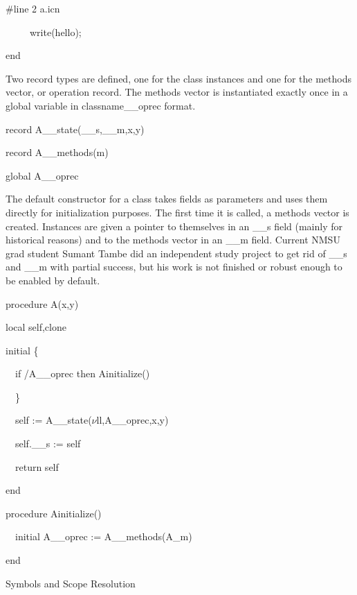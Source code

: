 \bigskip

{\ttfamily\mdseries
\#line 2 {\textquotedbl}a.icn{\textquotedbl}}

{\ttfamily\mdseries
\ \ \ \ \ write({\textquotedbl}hello{\textquotedbl});}

{\ttfamily\mdseries
end}


Two record types are defined, one for the class instances and one for
the {\textquotedbl}methods vector{\textquotedbl}, or
{\textquotedbl}operation record{\textquotedbl}. The methods vector is
instantiated exactly once in a global variable in classname\_\_oprec
format.

{\ttfamily\mdseries
record A\_\_state(\_\_s,\_\_m,x,y)}

{\ttfamily\mdseries
record A\_\_methods(m)}

{\ttfamily\mdseries
global A\_\_oprec}


The default constructor for a class takes fields as parameters and
uses them directly for initialization purposes. The first time it is
called, a methods vector is created. Instances are given a pointer to
themselves in an \_\_s field (mainly for historical reasons) and to
the methods vector in an \_\_m field. Current NMSU grad student Sumant
Tambe did an independent study project to get rid of \_\_s and \_\_m
with partial success, but his work is not finished or robust enough to
be enabled by default.

{\ttfamily\mdseries
procedure A(x,y)}

{\ttfamily\mdseries
local self,clone}

{\ttfamily\mdseries
initial \{}

{\ttfamily\mdseries
\ \ if /A\_\_oprec then Ainitialize()}

{\ttfamily\mdseries
\ \ \}}

{\ttfamily\mdseries
\ \ self := A\_\_state($\nu $ll,A\_\_oprec,x,y)}

{\ttfamily\mdseries
\ \ self.\_\_s := self}

{\ttfamily\mdseries
\ \ return self}

{\ttfamily\mdseries
end}


\bigskip

{\ttfamily\mdseries
procedure Ainitialize()}

{\ttfamily\mdseries
\ \ initial A\_\_oprec := A\_\_methods(A\_m)}

{\ttfamily\mdseries
end}

{\sffamily
Symbols and Scope Resolution }


